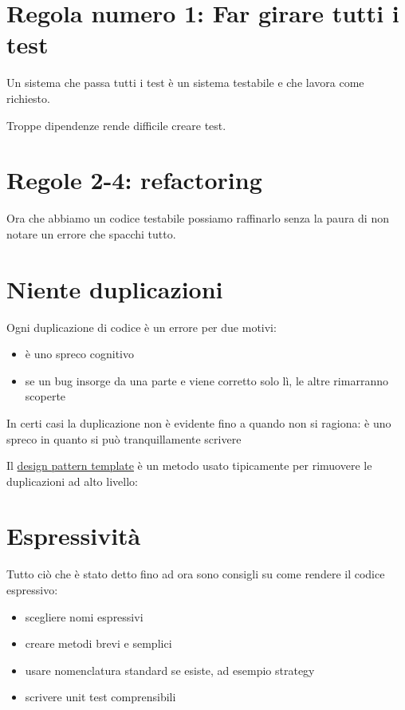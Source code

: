 \documentclass[11pt,a4paper]{book}
\begin{document}
\section{Regola numero 1: Far girare tutti i test}
Un sistema che passa tutti i test è un sistema testabile e che lavora come richiesto.

Troppe dipendenze rende difficile creare test.

\section{Regole 2-4: refactoring}
Ora che abbiamo un codice testabile possiamo raffinarlo senza la paura di non notare un errore che spacchi tutto.

\section{Niente duplicazioni}
Ogni duplicazione di codice è un errore per due motivi:
\begin{itemize}
	\item è uno spreco cognitivo
	\item se un bug insorge da una parte e viene corretto solo lì, le altre rimarranno scoperte
\end{itemize}

In certi casi la duplicazione non è evidente fino a quando non si ragiona:
\label{code: 059}
è uno spreco in quanto si può tranquillamente scrivere
\label{code: 060}

Il \href{https://refactoring.guru/design-patterns/template-method}{design pattern template} è un metodo usato tipicamente per rimuovere le duplicazioni ad alto livello:
\label{code: 061}

\section{Espressività}
Tutto ciò che è stato detto fino ad ora sono consigli su come rendere il codice espressivo:
\begin{itemize}
	\item scegliere nomi espressivi
	\item creare metodi brevi e semplici
	\item usare nomenclatura standard se esiste, ad esempio strategy
	\item scrivere unit test comprensibili
\end{itemize}
\end{document}
